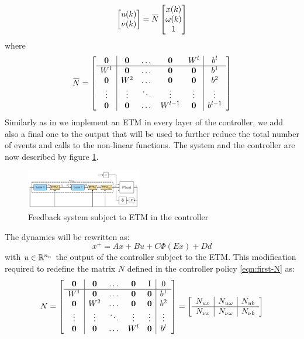 \documentclass{ifacconf}
\theoremstyle{plain}
\begin{document}
\begin{equation*}
  \bmx{u(k)\\ \nu(k)} = \overbar N \bmx{x(k) \\ \omega(k) \\ 1} 
\end{equation*}
where
\begin{equation}\label{eqn:first-N}
  \overbar N = \bmx{
    \begin{array}{c | c c c c | c}
      \0 & \0 & \dots & \0 & W^l & b^l \\ 
      \hline
      W^1 & \0 & \dots & \0 & \0 & b^1 \\
      \0 & W^2 & \dots & \0 & \0 & b^2 \\
      \vdots & \vdots & \ddots & \vdots & \vdots & \vdots \\
      \0 & \0 & \dots & W^{l-1} & \0 & b^{l-1}
    \end{array}
  }
\end{equation}
Similarly as in \cite{css-extended} we implement an ETM in every layer of the controller, we add also a final one to the output that will be used to further reduce the total number of events and calls to the non-linear functions. The system and the controller are now described by figure \ref{fig:second_scheme}.
\begin{figure}[H]
    \centering
    \includegraphics[width=0.45\textwidth]{Figures/second_scheme}
    \centering
    \caption{Feedback system subject to ETM in the controller}
    \label{fig:second_scheme}
\end{figure}
The dynamics will be rewritten as:
\begin{equation}\label{eqn:system-dynamics}
  x^{+} = A x + B u + C \Phi(E x) + D d
\end{equation}
with $u \in {\mathbb{R}}^{n_u}$ the output of the controller subject to the ETM. This modification required to redefine the matrix $N$ defined in the controller policy \eqref{eqn:first-N} as:
\begin{equation}\label{eqn:last-N}
  N = \left[\begin{matrix}
    \begin{array}{c | c c c c | c}
      \operatorname{\mathbf{0}} & \operatorname{\mathbf{0}} & \dots & \operatorname{\mathbf{0}} & \operatorname{I} & 0 \\ 
      \hline
      W^1 & \operatorname{\mathbf{0}} & \dots & \operatorname{\mathbf{0}} & \operatorname{\mathbf{0}} & b^1 \\
      \operatorname{\mathbf{0}} & W^2 & \dots & \operatorname{\mathbf{0}} & \operatorname{\mathbf{0}} & b^2 \\
      \vdots & \vdots & \ddots & \vdots & \vdots & \vdots \\
      \operatorname{\mathbf{0}} & \operatorname{\mathbf{0}} & \dots & W^l & \operatorname{\mathbf{0}} & b^l
    \end{array}
  \end{matrix}\right] = \left[\begin{matrix}
    \begin{array}{c | c | c}
    N_{u x} & N_{u \omega} & N_{u b} \\
    \hline
    N_{\nu x} & N_{\nu \omega} & N_{\nu b}
    \end{array} 
  \end{matrix}\right]
\end{equation}
\end{document}
